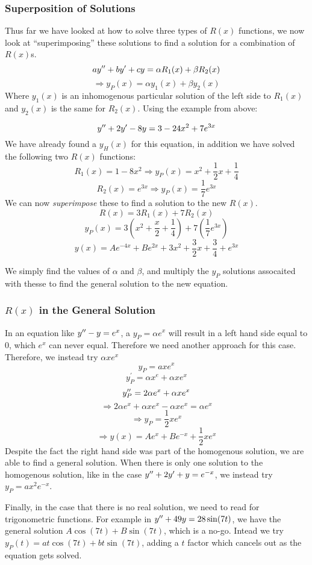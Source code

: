 \documentclass[12pt]{report}
\begin{document}
\begin{flushleft}
\subsubsection*{Superposition of Solutions}

Thus far we have looked at how to solve three types of \(R(x)\) functions, we
now look at ``superimposing'' these solutions to find a solution for a
combination of \(R(x)\)s.
\[ay^{\prime\prime} + by^\prime + cy = \alpha R_1(x) + \beta R_2(x)\]
\[\Rightarrow y_P(x) = \alpha y_1(x) + \beta y_2(x)\]
Where \(y_1(x)\) is an inhomogenous particular solution of the left side to
\(R_1(x)\) and \(y_2(x)\) is the same for \(R_2(x)\). Using the example from
above:

\begin{center}
    \[y^{\prime\prime} + 2y^\prime - 8y = 3 - 24x^2 + 7e^{3x}\]
    We have already found a \(y_H(x)\) for this equation, in addition we have
    solved the following two \(R(x)\) functions:
    \[R_1(x) = 1 - 8x^2 \Rightarrow y_P(x) = x^2 + \frac{1}{2}x + \frac{1}{4}\]
    \[R_2(x) = e^{3x} \Rightarrow y_P(x) = \frac{1}{7}e^{3x}\]
    We can now \textit{superimpose} these to find a solution to the new
    \(R(x)\).
    \[R(x) = 3R_1(x) + 7R_2(x)\]
    \[y_P(x) = 3(x^2 + \frac{x}{2} + \frac{1}{4}) + 7(\frac{1}{7}e^{3x})\]
    \[y(x) = Ae^{-4x} + Be^{2x} + 3x^2 + \frac{3}{2}x + \frac{3}{4} + e^{3x}\]
\end{center}
We simply find the values of \(\alpha\) and \(\beta\), and multiply the \(y_P\)
solutions assocaited with thesse to find the general solution to the new
equation.

\subsubsection*{\(R(x)\) in the General Solution}

In an equation like \(y^{\prime\prime} - y = e^x\), a \(y_P = \alpha e^x\) will result in
a left hand side equal to \(0\), which \(e^x\) can never equal. Therefore we
need another approach for this case. Therefore, we instead try \(\alpha xe^x\)
\[y_P = axe^x\]
\[y_P^\prime = \alpha x^e + \alpha xe^x\]
\[y_P^{\prime\prime} = 2\alpha e^x + \alpha xe^x\]
\[\Rightarrow 2\alpha e^x + \alpha xe^x - \alpha xe^x = \alpha e^x\]
\[\Rightarrow y_P = \frac{1}{2}xe^x\]
\[\Rightarrow y(x) = Ae^x + Be^{-x} + \frac{1}{2}xe^x\]
Despite the fact the right hand side was part of the homogenous solution, we
are able to find a general solution. When there is only one solution to the
homogenous solution, like in the case \(y^{\prime\prime} + 2y^\prime + y = e^{-x}\), we
instead try \(y_P = ax^2e^{-x}\). \par
Finally, in the case that there is no real
solution, we need to read for trigonometric functions. For example in
\(y^{\prime\prime} + 49y = 28\sin(7t)\), we have the general solution
\(A\cos(7t) + B\sin(7t)\), which is a no-go. Intead we try 
\(y_P(t) = at\cos(7t) + bt\sin(7t)\), adding a \(t\) factor which cancels out
as the equation gets solved.


\end{flushleft}
\end{document}
